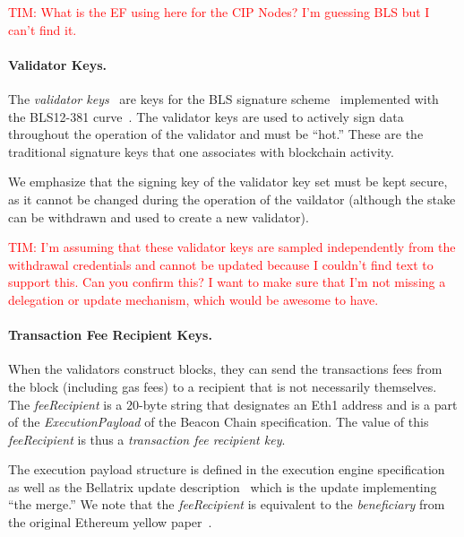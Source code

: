 \textcolor{red}{TIM:  What is the EF using here for the CIP Nodes?  I'm guessing BLS but I can't find it.}

\paragraph{Validator Keys.}  The \emph{validator keys}~\cite{EthVal} are keys for the BLS signature scheme~\cite{AC:BonLynSha01} implemented with the BLS12-381 curve~\cite{BLS12-318}.  The validator keys are used to actively sign data throughout the operation of the validator and must be ``hot.'' These are the traditional signature keys that one associates with blockchain activity.

We emphasize that the signing key of the validator key set must be kept secure, as it cannot be changed during the operation of the vaildator (although the stake can be withdrawn and used to create a new validator).

\textcolor{red}{TIM:  I'm assuming that these validator keys are sampled independently from the withdrawal credentials and cannot be updated because I couldn't find text to support this.  Can you confirm this?  I want to make sure that I'm not missing a delegation or update mechanism, which would be awesome to have.}

\paragraph{Transaction Fee Recipient Keys.}    When the validators construct blocks, they can send the transactions fees from the block (including gas fees) to a recipient that is not necessarily themselves.  The \emph{feeRecipient} is a $20$-byte string that designates an Eth1 address and is a part of the \emph{ExecutionPayload} of the Beacon Chain specification.  The value of this \emph{feeRecipient} is thus a \emph{transaction fee recipient key}.  

The execution payload structure is defined in the execution engine specification~\cite{EthEng} as well as the Bellatrix update description~\cite{EthBella} which is the update implementing ``the merge.''  We note that the \emph{feeRecipient} is equivalent to the \emph{beneficiary} from the original Ethereum yellow paper~\cite{wood2014ethereum}.